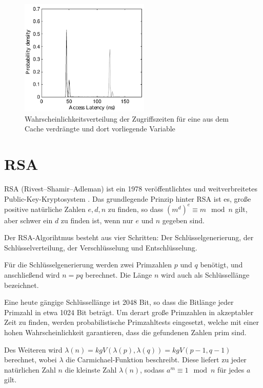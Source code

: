 \label{fig:RAMCacheLatency}
\begin{figure}[h]
\centering
\includegraphics[width=0.55\textwidth]{basics/i7-4790HQ_latency_plot.pdf}
\caption{Wahrscheinlichkeitsverteilung der Zugriffszeiten für eine aus dem Cache verdrängte und dort vorliegende Variable \cite{TheSpyInTheSandbox}}
\end{figure}

\section{RSA}

RSA (Rivest–Shamir–Adleman) ist ein 1978 veröffentlichtes und weitverbreitetes Public-Key-Kryptosystem \cite{RSAPaper}.
Das grundlegende Prinzip hinter RSA ist es,  große positive natürliche Zahlen $e,d,n$ zu finden, so dass $(m^d)^e \equiv m \mod n$ gilt, aber schwer ein $d$ zu finden ist, wenn nur $e$ und $n$ gegeben sind.

Der RSA-Algorihtmus besteht aus vier Schritten: Der Schlüsselgenerierung, der Schlüsselverteilung, der Verschlüsselung und Entschlüsselung.

Für die Schlüsselgenerierung werden zwei Primzahlen $p$ und $q$ benötigt, und anschließend wird $n = pq$ berechnet. Die Länge $n$ wird auch als Schlüssellänge bezeichnet.

Eine heute gängige Schlüssellänge ist 2048 Bit, so dass die Bitlänge jeder Primzahl in etwa 1024 Bit beträgt. 
Um derart große Primzahlen in akzeptabler Zeit zu finden, werden probabilistische Primzahltests eingesetzt, welche mit einer hohen Wahrscheinlichkeit garantieren, dass die gefundenen Zahlen prim sind.

Des Weiteren wird $\lambda(n) = kgV(\lambda(p),\lambda(q)) = kgV(p-1, q-1)$ berechnet, wobei $\lambda$ die Carmichael-Funktion beschreibt.
Diese liefert zu jeder natürlichen Zahl $n$ die kleinste Zahl $\lambda(n)$, sodass $a^m \equiv 1 \mod n$ für jedes $a$ gilt.

